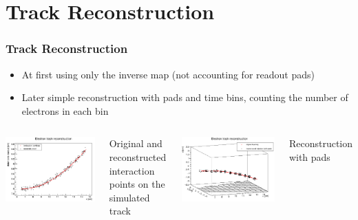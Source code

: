 \documentclass{beamer}
\begin{document}
	\section{Track Reconstruction}
	\begin{frame}
		\frametitle{Track Reconstruction}
		\begin{itemize}
			\item At first using only the inverse map (not accounting for readout pads)
			\item Later simple reconstruction with pads and time bins, counting the number of electrons in each bin
		\end{itemize}
		\begin{columns}
				\centering
				\begin{minipage}[t][4.5cm]{\textwidth}
					\centering
					\includegraphics[width=\textwidth]{../images/reco_track_new.png}\\
				\end{minipage}
				\small{Original and reconstructed interaction points on the simulated track}
				\centering
				\begin{minipage}[t][4.5cm]{\textwidth}
					\centering
					\includegraphics[width=\textwidth]{../images/reco_track_pads.png}\\
				\end{minipage}
				\small{Reconstruction with pads}
		\end{columns}
	\end{frame}
\end{document}
